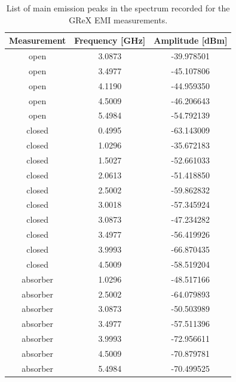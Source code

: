 \documentclass[12pt,a4paper,oneside]{article}
\begin{document}
\begin{table}[]
    \centering
   
    \begin{tabular}{|c|c|c|}
    \hline
         \cellcolor[gray]{0.85} Measurement & \cellcolor[gray]{0.85} Frequency [GHz] &  \cellcolor[gray]{0.85} Amplitude [dBm]\\ \hline
         open & 3.0873 & -39.978501 \\ \hline
         open & 3.4977 & -45.107806 \\ \hline
         open & 4.1190 & -44.959350 \\ \hline
         open & 4.5009 & -46.206643 \\ \hline
         open & 5.4984 & -54.792139 \\ \hline
         \hline
         closed & 0.4995 & -63.143009 \\ \hline
         closed & 1.0296 & -35.672183 \\ \hline
         closed & 1.5027 & -52.661033 \\ \hline
         closed & 2.0613 & -51.418850 \\ \hline
         closed & 2.5002 & -59.862832 \\ \hline
         closed & 3.0018 & -57.345924 \\ \hline
         closed & 3.0873 & -47.234282 \\ \hline
         closed & 3.4977 & -56.419926 \\ \hline
         closed & 3.9993 & -66.870435 \\ \hline
         closed & 4.5009 & -58.519204 \\ \hline
         \hline
         absorber & 1.0296 & -48.517166 \\ \hline
         absorber & 2.5002 & -64.079893 \\ \hline
         absorber & 3.0873 & -50.503989 \\ \hline
         absorber & 3.4977 & -57.511396 \\ \hline
         absorber & 3.9993 & -72.956611 \\ \hline
         absorber & 4.5009 & -70.879781 \\ \hline
         absorber & 5.4984 & -70.499525 \\ \hline

    \end{tabular}
    \caption{List of main emission peaks in the spectrum recorded for the GReX EMI measurements.}
    \label{tab:main_emission_peaks}
\end{table}
\end{document}
